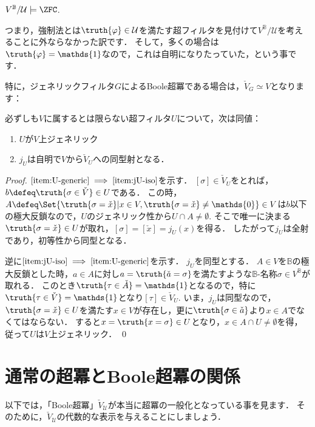 \documentclass[a4j]{ltjsarticle}
\begin{document}
\begin{corollary}
 $V^{\mathbb{B}}/\mathcal{U} \models \ZFC$.
\end{corollary}

つまり，強制法とは$\truth{\varphi} \in \mathcal{U}$を満たす超フィルタを見付けて$V^{\mathbb{B}}/\mathcal{U}$を考えることに外ならなかった訳です．
そして，多くの場合は$\truth{\varphi} = \mathds{1}$なので，これは自明になりたっていた，という事です．

特に，ジェネリックフィルタ$G$によるBoole超冪である場合は，$\check{V}_G \simeq V$となります：

\begin{theorem}
 必ずしも$V$に属するとは限らない超フィルタ$U$について，次は同値：
 \begin{enumerate}
  \item \label{item:U-generic}$U$が$V$上ジェネリック
  \item \label{item:jU-iso}$j_U$は自明で$V$から$\check{V}_U$への同型射となる．
 \end{enumerate}
\end{theorem}
\begin{proof}
 $\ref{item:U-generic} \implies \ref{item:jU-iso}$を示す．
 $[\sigma] \in \check{V}_U$をとれば，$b \defeq \truth{\sigma \in \check{V}} \in U$である．
 この時，$A \defeq \Set{ \truth{\sigma = \check{x}} | x \in V, \truth{\sigma = \check{x}} \neq \mathds{0}} \in V$は$b$以下の極大反鎖なので，$U$のジェネリック性から$U \cap A \neq \emptyset$.
 そこで唯一に決まる$\truth{\sigma = \check{x}} \in U$が取れ，$[\sigma] = [\check{x}] = j_U(x)$を得る．
 したがって$j_U$は全射であり，初等性から同型となる．

 逆に$\ref{item:jU-iso} \implies \ref{item:U-generic}$を示す．
 $j_U$を同型とする．
 $A \in V$を$\mathbb{B}$の極大反鎖とした時，$a \in A$に対し$a = \truth{\check{a} = \sigma}$を満たすような$\mathbb{B}$-名称$\sigma \in V^{\mathbb{B}}$が取れる．
 このとき$\truth{\tau \in \check{A}} = \mathds{1}$となるので，特に$\truth{\tau \in \check{V}} = \mathds{1}$となり$[\tau] \in \check{V}_U$.
 いま，$j_U$は同型なので，$\truth{\sigma = \check{x}} \in U$を満たす$x \in V$が存在し，更に$\truth{\sigma \in \check{a}}$より$x \in A$でなくてはならない．
 すると$x = \truth{x = \sigma} \in U$となり，$x \in A \cap U \neq \emptyset$を得，
 従って$U$は$V$上ジェネリック． \qed
\end{proof}

\section{通常の超冪とBoole超冪の関係}
以下では，「Boole超冪」$\check{V}_{\mathcal{U}}$が本当に超冪の一般化となっている事を見ます．
そのために，$\check{V}_{\mathcal{U}}$の代数的な表示を与えることにしましょう．
\end{document}
